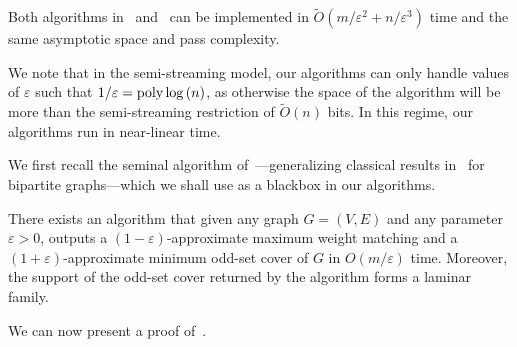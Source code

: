 \documentclass{theoretics}
\newcommand{\Ot}{\widetilde{O}}
\newcommand{\eps}{\varepsilon}
\newcommand{\poly}{\mbox{\rm poly}}
\begin{document}
\begin{corollary}\label{cor:time-efficient}
	Both algorithms in~ and~ can be implemented in $\Ot(m/\eps^2 + n/\eps^3)$ time and the same asymptotic space and pass complexity. 
\end{corollary}
\noindent
We note that in the semi-streaming model, our algorithms can only handle values of $\eps$ such that $1/\eps = \poly\log{(n)}$, as otherwise the space of the algorithm will be more than the semi-streaming restriction of $\Ot(n)$ bits. 
In this regime, our algorithms run in near-linear time. 

We first recall the seminal algorithm of~\cite{DuanP14}---generalizing classical results in~\cite{HopcroftK73} for bipartite graphs---which we shall use as a blackbox in our algorithms. 

\begin{proposition}\label{prop:DuanP14}
	There exists an algorithm that given any graph $G=(V,E)$ and any parameter $\eps > 0$, outputs a $(1-\eps)$-approximate maximum weight matching and a $(1+\eps)$-approximate minimum odd-set cover of $G$ 
	in $O(m/\eps)$ time. Moreover, the support of the odd-set cover returned by the algorithm forms a laminar family. 
\end{proposition}

We can now present a proof of~. 
\end{document}
